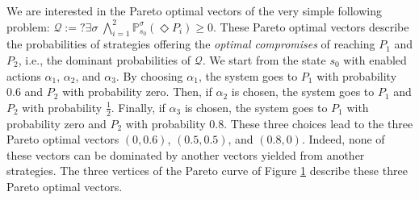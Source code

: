 \begin{example}
\begin{figure}[h]
    \label{pareto-curve-example}
  \end{figure}
We are interested in the Pareto optimal vectors of the very simple following \MOSR{} problem:
$\mathcal{Q}:= ?\exists \sigma \; \bigwedge_{i=1}^2 \mathbb{P}^\sigma_{s_0}(\Diamond P_i) \geq 0$.
These Pareto optimal vectors describe the probabilities of strategies offering the \textit{optimal compromises} of reaching $P_1$ and $P_2$, i.e., the dominant probabilities of $\mathcal{Q}$.
We start from the state $s_0$ with enabled actions $\alpha_1$, $\alpha_2$, and $\alpha_3$.
By choosing $\alpha_1$, the system goes to $P_1$ with probability $0.6$ and $P_2$ with probability zero.
Then, if $\alpha_2$ is chosen, the system goes to $P_1$ and $P_2$ with probability $\frac{1}{2}$.
Finally, if $\alpha_3$ is chosen, the system goes to $P_1$ with probability zero and $P_2$ with probability $0.8$.
These three choices lead to the three Pareto optimal  vectors
$(0, 0.6)$, $(0.5, 0.5)$, and $(0.8, 0)$.
Indeed, none of these vectors can be dominated by
another vectors yielded from another strategies.
The three vertices of the Pareto curve of Figure \ref{pareto-curve-example} describe these three Pareto optimal vectors.
\end{example}



